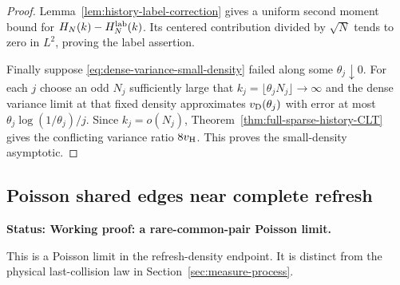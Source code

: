 \documentclass[11pt,letterpaper]{article}
\newcommand{\status}[1]{\textbf{Status: #1.}}
\begin{document}
\begin{proof}
Lemma~\ref{lem:history-label-correction} gives a uniform second
moment bound for $H_N(k)-H_N^{\rm lab}(k)$. Its centered
contribution divided by $\sqrt N$ tends to zero in $L^2$,
proving the label assertion.

Finally suppose \eqref{eq:dense-variance-small-density} failed
along some $\theta_j\downarrow0$. For each $j$ choose an odd
$N_j$ sufficiently large that $k_j=\lfloor\theta_jN_j\rfloor
\to\infty$ and the dense variance limit at that fixed density
approximates $v_{\rm D}(\theta_j)$ with error at most
$\theta_j\log(1/\theta_j)/j$. Since $k_j=o(N_j)$,
Theorem~\ref{thm:full-sparse-history-CLT} gives the conflicting
variance ratio $8v_{\rm H}$. This proves the small-density asymptotic.
\end{proof}

\subsection{Poisson shared edges near complete refresh}
\label{sec:endpoint-Poisson}

\status{Working proof: a rare-common-pair Poisson limit}

This is a Poisson limit in the refresh-density endpoint.
It is distinct from the physical last-collision law in
Section~\ref{sec:measure-process}.
\end{document}
